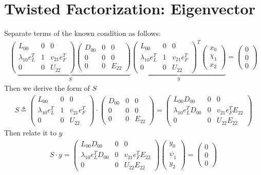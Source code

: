 \documentclass[11pt,a4paper]{article}
\begin{document}
\newpage
\section{Twisted Factorization: Eigenvector}
\renewcommand{\LLL}{\left( \begin{array}{ccc}
        L_{00} & 0 & 0 \\
        \lambda_{10} e_L^T & 1 & v_{21} e_F^T \\
        0 & 0 & U_{22} \end{array} \right)}
\renewcommand{\DDD}{\left( \begin{array}{ccc}
        D_{00} & 0 & 0 \\
        0 & 0 & 0 \\
        0 & 0 & E_{22} \end{array} \right)}
\newcommand{\xxx}{\left( \begin{array}{c}
        x_{0}  \\
        \chi_1   \\
        x_2  \end{array} \right)}
\newcommand{\yyy}{\left( \begin{array}{c}
        y_{0}  \\
        \psi_1   \\
        y_2  \end{array} \right)}
\newcommand{\zerovec}{\left( \begin{array}{c}
        0 \\
        0 \\ 
        0  \end{array} \right)}
Separate terms of the known condition as follows:
\begin{align}
    \underbrace{\LLL \DDD}_{S} \underbrace{\LLL^T \xxx}_y = \zerovec
\end{align}
Then we derive the form of $S$
\begin{align}
   S \triangleq \LLL \cdot \DDD = \left( \begin{array}{ccc}
            L_{00} D_{00} & 0 & 0 \\
            \lambda_{10} e_L^T D_{00} & 0 & v_{21} e_F^T E_{22} \\
            0 & 0 & U_{22} E_{22} \end{array} \right)
\end{align}
Then relate it to $y$
\begin{align} \label{444}
    S \cdot y = \left( \begin{array}{ccc}
            L_{00} D_{00} & 0 & 0 \\
            \lambda_{10} e_L^T D_{00} & 0 & v_{21} e_F^T E_{22} \\
            0 & 0 & U_{22} E_{22} \end{array} \right) \yyy = \zerovec
\end{align}
\end{document}
